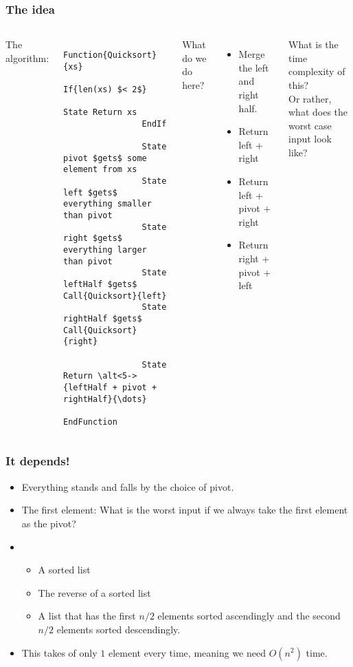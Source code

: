 \begin{frame}[fragile]
	\frametitle{The idea}
		\begin{columns}[T]
			The algorithm:
		\begin{lstlisting}
			Function{Quicksort}{xs}
				If{len(xs) $< 2$}	
					State Return xs
				EndIf
				
				State pivot $gets$ some element from xs
				State left $gets$ everything smaller than pivot
				State right $gets$ everything larger than pivot
				State leftHalf $gets$ Call{Quicksort}{left}
				State rightHalf $gets$ Call{Quicksort}{right}
				
				State Return \alt<5->{leftHalf + pivot + rightHalf}{\dots}
			EndFunction
		\end{lstlisting}
		
			What do we do here?
				\begin{itemize}
					\item Merge the left and right half.
					\item Return left + right
					\item Return left + pivot + right
					\item Return right + pivot + left
				\end{itemize}
	
					What is the time complexity of this?\\
					Or rather, what does the worst case input look like?
		\end{columns}
\end{frame}

\begin{frame}
	\frametitle{It depends!}
				\begin{itemize}
					\item Everything stands and falls by the choice of pivot.
					\item The first element:
		What is the worst input if we always take the first element as the pivot?
					\item 
					\begin{itemize}
						\item A sorted list
						\item The reverse of a sorted list
						\item A list that has the first $n/2$ elements sorted ascendingly and the second $n/2$ elements sorted descendingly.
					\end{itemize}
					\item This takes of only $1$ element every time, meaning we need $O(n^2)$ time.	
	\end{itemize}
\end{frame}

